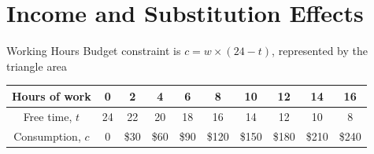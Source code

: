 \documentclass[11pt,aspectratio=43,usenames,dvipsnames]{beamer}
\theoremstyle{definition}
\begin{document}
\section[I\&SEffect]{Income and Substitution Effects}
\label{sec:Income_and_Substitution_Effects}

\begin{frame}[fragile]{Working Hours}
\label{slide:Working_Hours}
Budget constraint is $ c = w \times (24 - t) $, represented by the triangle area
    \begin{center}
        \scriptsize
        \begin{tabular}{c|c|c|c|c|c|c|c|c|c}
            Hours of work   &  0   &  2   &  4   &  6   &  8   &  10   &  12   &  14   &  16
            \\
            \hline
            Free time, $t$   &  24   &  22   &  20   &  18   &  16   &  14   &  12   &  10   &  8
            \\
            \hline
            Consumption, $c$   &  0   &  \$30   &  \$60   &  \$90   &  \$120   &  \$150   &  \$180   &  \$210   &  \$240
            \\
        \end{tabular}
    \end{center}





\end{frame}
\end{document}
